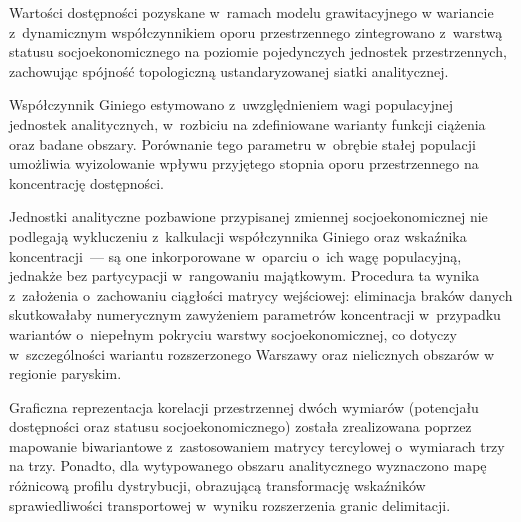 \documentclass{pracamgr}
\begin{document}
Wartości dostępności pozyskane w~ramach modelu grawitacyjnego w wariancie z~dynamicznym współczynnikiem oporu przestrzennego zintegrowano z~warstwą statusu socjoekonomicznego na poziomie pojedynczych jednostek przestrzennych, zachowując spójność topologiczną ustandaryzowanej siatki analitycznej.

Współczynnik Giniego estymowano z~uwzględnieniem wagi populacyjnej jednostek analitycznych, w~rozbiciu na zdefiniowane warianty funkcji ciążenia oraz badane obszary. Porównanie tego parametru w~obrębie stałej populacji umożliwia wyizolowanie wpływu przyjętego stopnia oporu przestrzennego na koncentrację dostępności.

Jednostki analityczne pozbawione przypisanej zmiennej socjoekonomicznej nie podlegają wykluczeniu z~kalkulacji współczynnika Giniego oraz wskaźnika koncentracji~--- są one inkorporowane w~oparciu o~ich wagę populacyjną, jednakże bez partycypacji w~rangowaniu majątkowym. Procedura ta wynika z~założenia o~zachowaniu ciągłości matrycy wejściowej: eliminacja braków danych skutkowałaby numerycznym zawyżeniem parametrów koncentracji w~przypadku wariantów o~niepełnym pokryciu warstwy socjoekonomicznej, co dotyczy w~szczególności wariantu rozszerzonego Warszawy oraz nielicznych obszarów w regionie paryskim.

Graficzna reprezentacja korelacji przestrzennej dwóch wymiarów (potencjału dostępności oraz statusu socjoekonomicznego) została zrealizowana poprzez mapowanie biwariantowe z~zastosowaniem matrycy tercylowej o~wymiarach trzy na trzy. Ponadto, dla wytypowanego obszaru analitycznego wyznaczono mapę różnicową profilu dystrybucji, obrazującą transformację wskaźników sprawiedliwości transportowej w~wyniku rozszerzenia granic delimitacji.
\end{document}
